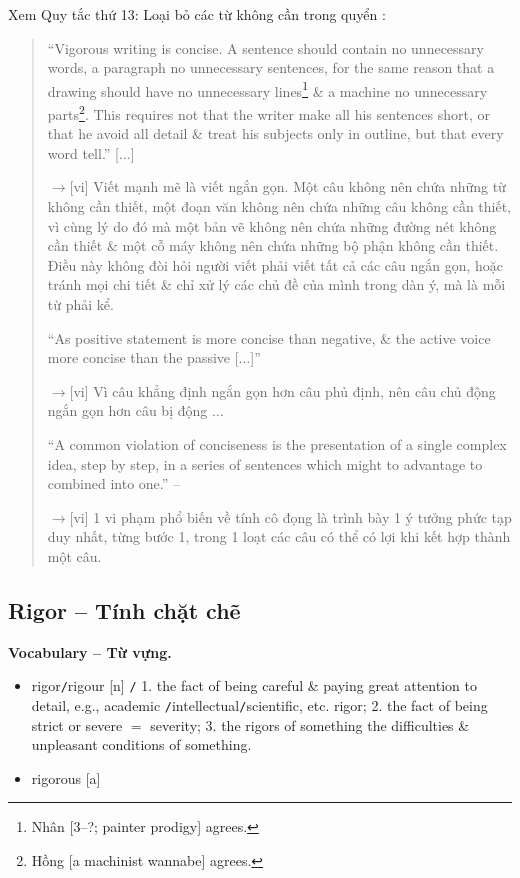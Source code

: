 \documentclass[12pt,oneside]{book}
\begin{document}
Xem Quy tắc thứ 13: Loại bỏ các từ không cần trong quyển \cite{Strunk_element_style,Strunk_White_element_style}:
\begin{quote}
	``Vigorous writing is concise. A sentence should contain no unnecessary words, a paragraph no unnecessary sentences, for the same reason that a drawing should have no unnecessary lines\footnote{{\sf Nhân [3--?; painter prodigy]} agrees.} \& a machine no unnecessary parts\footnote{{\sf Hồng [a machinist wannabe]} agrees.}. This requires not that the writer make all his sentences short, or that he avoid all detail \& treat his subjects only in outline, but that every word tell.'' [$\ldots$]
	
	{\sf[en]$\to$[vi]} Viết mạnh mẽ là viết ngắn gọn. Một câu không nên chứa những từ không cần thiết, một đoạn văn không nên chứa những câu không cần thiết, vì cùng lý do đó mà một bản vẽ không nên chứa những đường nét không cần thiết \& một cỗ máy không nên chứa những bộ phận không cần thiết. Điều này không đòi hỏi người viết phải viết tất cả các câu ngắn gọn, hoặc tránh mọi chi tiết \& chỉ xử lý các chủ đề của mình trong dàn ý, mà là mỗi từ phải kể.
	
	``As positive statement is more concise than negative, \& the active voice more concise than the passive [$\ldots$]''
	
	{\sf[en]$\to$[vi]} Vì câu khẳng định ngắn gọn hơn câu phủ định, nên câu chủ động ngắn gọn hơn câu bị động $\ldots$
	
	``A common violation of conciseness is the presentation of a single complex idea, step by step, in a series of sentences which might to advantage to combined into one.'' -- \cite[Rule 13: Omit needless words]{Strunk_element_style,Strunk_White_element_style}
	
	{\sf[en]$\to$[vi]} 1 vi phạm phổ biến về tính cô đọng là trình bày 1 ý tưởng phức tạp duy nhất, từng bước 1, trong 1 loạt các câu có thể có lợi khi kết hợp thành một câu.
\end{quote}

\subsection{Rigor -- Tính chặt chẽ}
\textbf{\textsf{\small Vocabulary -- Từ vựng.}}
\begin{itemize}\small
	\item {\sf rigor{\tt/}rigour} [n] {\tt/} 1. the fact of being careful \& paying great attention to detail, e.g., academic {\tt/}intellectual{\tt/}scientific, etc. rigor; 2. the fact of being strict or severe $=$ {\sf severity}; 3. {\sf the rigors of something} the difficulties \& unpleasant conditions of something.
	\item {\sf rigorous} [a] 
\end{itemize}
\end{document}
